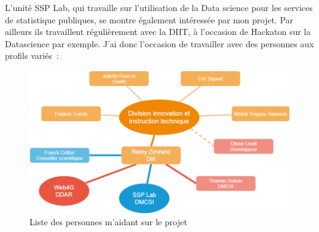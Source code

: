 L'unité SSP Lab, qui travaille sur l'utilisation de la Data science pour les services de statistique publiques, se montre également intéressée par mon projet. Par ailleurs ils travaillent régulièrement avec la DIIT, à l'occasion de Hackaton sur la Datascience par exemple. J'ai donc l'occasion de travailler avec des personnes aux profils variés~:
\vspace{10pt}
\begin{figure}[H]
  \centering
  \includegraphics[scale=0.45]{images/Organigramme-stage.png}
  \caption{Liste des personnes m'aidant sur le projet}
  \label{fig:Organigramme}
\end{figure}

\vspace{20pt}

